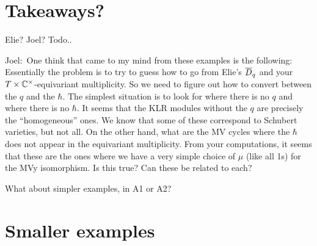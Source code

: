 \documentclass[11pt]{article}
\newcommand{\joel}[1]{{\color{red!50!orange}Joel:~#1}}
\begin{document}
\section*{Takeaways?}
Elie? Joel? Todo.. 
\joel{One think that came to my mind from these examples is the following:
Essentially the problem is to try to guess how to go from Elie's
$\overline{D}_q$ and your $T \times \mathbb C^\times$-equivariant multiplicity. So we need
to figure out how to convert between the $q$ and the $\hbar$.  The
simplest situation is to look for where there is no $q$ and where there
is no $\hbar$.  It seems that the KLR modules without the $q$ are
precisely the ``homogeneous'' ones.  We know that some of these
correspond to Schubert varieties, but not all.  On the other hand,
what are the MV cycles where the $\hbar$ does not appear in the
equivariant multiplicity. From your computations, it seems that these
are the ones where we have a very simple choice of $\mu$ (like all 1s)
for the MVy isomorphism. Is this true? Can these be related to each?

What about simpler examples, in A1 or A2?}

\section*{Smaller examples}
% 
\end{document}
